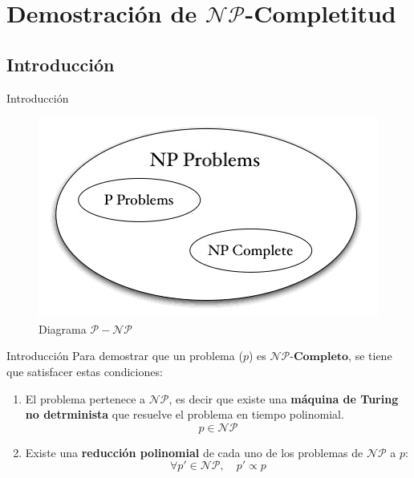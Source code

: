 \documentclass{beamer}
\begin{document}
\section{Demostración de $\mathcal{NP}$-Completitud}
\subsection{Introducción}

\begin{frame}{Introducción}
    \begin{figure}
        \centering
        \includegraphics[scale=0.7]{images/p-np.jpg}
        \caption{Diagrama $\mathcal{P} - \mathcal{NP}$}
    \end{figure}
\end{frame}

\begin{frame}{Introducción}
    Para demostrar que un problema ($p$) es $\mathcal{NP}\textbf{-Completo}$, se tiene que satisfacer estas condiciones:
    \vfill
    \begin{enumerate}[I]
        \item El problema pertenece a $\mathcal{NP}$, es decir que existe una \textbf{máquina de Turing no detrminista} que resuelve el problema en tiempo polinomial.
        \[p \in \mathcal{NP}\]
        \item Existe una \textbf{reducción polinomial} de cada uno de los problemas de $\mathcal{NP}$
        a $p$:
        \[\forall p' \in \mathcal{NP}, \quad p' \propto p\]
    \end{enumerate}
\end{frame}
\end{document}
